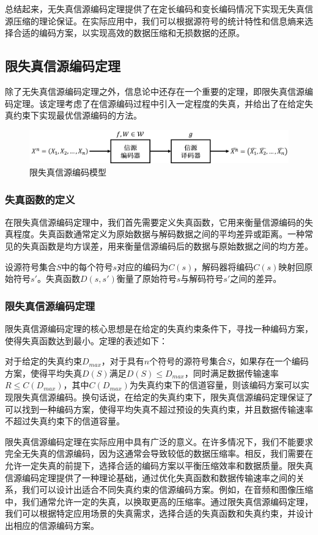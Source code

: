 \begin{multicols}{2}
总结起来，无失真信源编码定理提供了在定长编码和变长编码情况下实现无失真信源压缩的理论保证。在实际应用中，我们可以根据源符号的统计特性和信息熵来选择合适的编码方案，以实现高效的数据压缩和无损数据的还原。
\subsection{限失真信源编码定理}
除了无失真信源编码定理之外，信息论中还存在一个重要的定理，即限失真信源编码定理。该定理考虑了在信源编码过程中引入一定程度的失真，并给出了在给定失真约束下实现最优信源编码的方法。
\begin{figure}[H]
	\centering
	\includegraphics[width=0.95\linewidth]{pics/xinyuan}
	\caption{限失真信源编码模型}
	\label{fig:xinyuan}
\end{figure}
\subsubsection{失真函数的定义}
在限失真信源编码定理中，我们首先需要定义失真函数，它用来衡量信源编码的失真程度。失真函数通常定义为原始数据与解码数据之间的平均差异或距离。一种常见的失真函数是均方误差，用来衡量信源编码后的数据与原始数据之间的均方差。

设源符号集合$S$中的每个符号$s$对应的编码为$C(s)$，解码器将编码$C(s)$映射回原始符号$s'$。失真函数$D(s, s')$衡量了原始符号$s$与解码符号$s'$之间的差异。

\subsubsection{限失真信源编码定理}
限失真信源编码定理的核心思想是在给定的失真约束条件下，寻找一种编码方案，使得失真函数达到最小。定理的表述如下：

对于给定的失真约束$D_{max}$，对于具有$n$个符号的源符号集合$S$，如果存在一个编码方案，使得平均失真$D(S)$满足$D(S)\leq D_{max}$，同时满足数据传输速率$R\leq C(D_{max})$，其中$C(D_{max})$为失真约束下的信道容量，则该编码方案可以实现限失真信源编码。换句话说，在给定的失真约束下，限失真信源编码定理保证了可以找到一种编码方案，使得平均失真不超过预设的失真约束，并且数据传输速率不超过失真约束下的信道容量。

限失真信源编码定理在实际应用中具有广泛的意义。在许多情况下，我们不能要求完全无失真的信源编码，因为这通常会导致较低的数据压缩率。相反，我们需要在允许一定失真的前提下，选择合适的编码方案以平衡压缩效率和数据质量。限失真信源编码定理提供了一种理论基础，通过优化失真函数和数据传输速率之间的关系，我们可以设计出适合不同失真约束的信源编码方案。例如，在音频和图像压缩中，我们通常允许一定的失真，以换取更高的压缩率。通过限失真信源编码定理，我们可以根据特定应用场景的失真需求，选择合适的失真函数和失真约束，并设计出相应的信源编码方案。


\end{multicols}
